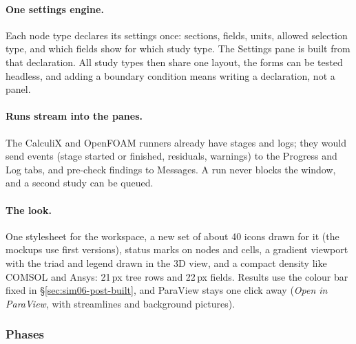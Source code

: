 \paragraph{One settings engine.} Each node type declares its settings once: sections, fields, units, allowed
selection type, and which fields show for which study type. The Settings pane is built from that declaration. All
study types then share one layout, the forms can be tested headless, and adding a boundary condition means writing
a declaration, not a panel.

\paragraph{Runs stream into the panes.} The CalculiX and OpenFOAM runners already have stages and logs; they would
send events (stage started or finished, residuals, warnings) to the Progress and Log tabs, and pre-check findings
to Messages. A run never blocks the window, and a second study can be queued.

\paragraph{The look.} One stylesheet for the workspace, a new set of about 40 icons drawn for it (the mockups use
first versions), status marks on nodes and cells, a gradient viewport with the triad and legend drawn in the 3D
view, and a compact density like COMSOL and Ansys: 21\,px tree rows and 22\,px fields. Results use the colour bar
fixed in \S\ref{sec:sim06-post-built}, and ParaView stays one click away (\emph{Open in ParaView}, with streamlines
and background pictures).

\subsubsection*{Phases}

